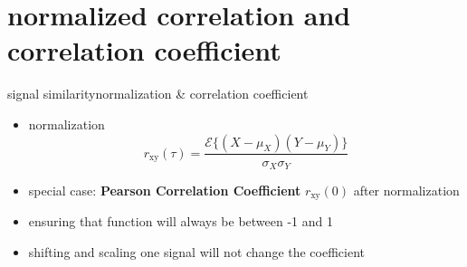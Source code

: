 \section[correlation coefficient]{normalized correlation and correlation coefficient}
\begin{frame}{signal similarity}{normalization \& correlation coefficient}
    \begin{itemize}
        \item normalization
        \begin{equation*}\nonumber
            r_\mathrm{xy}(\tau) = \frac{\mathcal{E}\lbrace(X-\mu_X)(Y-\mu_Y)\rbrace}{\sigma_X\sigma_Y}
        \end{equation*}
        \item   special case: \textbf{Pearson Correlation Coefficient} $r_\mathrm{xy}(0)$ after normalization
    \end{itemize}
    
    
    \bigskip
    \bigskip
        \begin{itemize}
            \item   ensuring that function will always be between -1 and 1
            \item   shifting and scaling one signal will not change the coefficient
        \end{itemize}
\end{frame}


